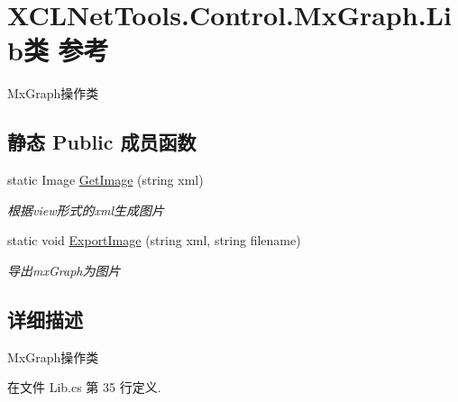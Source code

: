 \hypertarget{class_x_c_l_net_tools_1_1_control_1_1_mx_graph_1_1_lib}{\section{X\-C\-L\-Net\-Tools.\-Control.\-Mx\-Graph.\-Lib类 参考}
\label{class_x_c_l_net_tools_1_1_control_1_1_mx_graph_1_1_lib}
}


Mx\-Graph操作类  


\subsection*{静态 Public 成员函数}
\begin{DoxyCompactItemize}
\item 
static Image \hyperlink{class_x_c_l_net_tools_1_1_control_1_1_mx_graph_1_1_lib_abff455d51f61485d6bf26e0133af6000}{Get\-Image} (string xml)
\begin{DoxyCompactList}\small\item\em 根据view形式的xml生成图片 \end{DoxyCompactList}\item 
static void \hyperlink{class_x_c_l_net_tools_1_1_control_1_1_mx_graph_1_1_lib_ad6b09c60b11a1f51a6bf45cc3bde1b88}{Export\-Image} (string xml, string filename)
\begin{DoxyCompactList}\small\item\em 导出mx\-Graph为图片 \end{DoxyCompactList}\end{DoxyCompactItemize}


\subsection{详细描述}
Mx\-Graph操作类 



在文件 Lib.\-cs 第 35 行定义.



